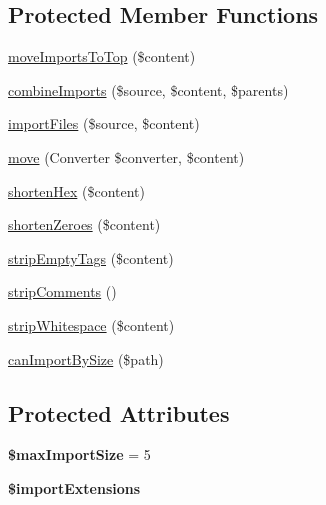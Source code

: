 \subsection*{Protected Member Functions}
\begin{DoxyCompactItemize}
\item 
\hyperlink{classMatthiasMullie_1_1Minify_1_1CSS_a5386ca48afa960a0d38e6a6c6cc33524}{move\+Imports\+To\+Top} (\$content)
\item 
\hyperlink{classMatthiasMullie_1_1Minify_1_1CSS_a35edd8cac08f2804285f0fed59cf433d}{combine\+Imports} (\$source, \$content, \$parents)
\item 
\hyperlink{classMatthiasMullie_1_1Minify_1_1CSS_a086c79c42e98915aea8717f3ceecd8df}{import\+Files} (\$source, \$content)
\item 
\hyperlink{classMatthiasMullie_1_1Minify_1_1CSS_ac51ff618a433cb21cac1a5461f60e83d}{move} (Converter \$converter, \$content)
\item 
\hyperlink{classMatthiasMullie_1_1Minify_1_1CSS_a8cb5447bafb6729cf834342764ad2e71}{shorten\+Hex} (\$content)
\item 
\hyperlink{classMatthiasMullie_1_1Minify_1_1CSS_a78937078a88a71de25f9e5004bb89ce0}{shorten\+Zeroes} (\$content)
\item 
\hyperlink{classMatthiasMullie_1_1Minify_1_1CSS_a6b69c7a87572e206dd0e2da0910d4504}{strip\+Empty\+Tags} (\$content)
\item 
\hyperlink{classMatthiasMullie_1_1Minify_1_1CSS_ac819241f35b6e70212739f651fdd4d85}{strip\+Comments} ()
\item 
\hyperlink{classMatthiasMullie_1_1Minify_1_1CSS_a631d8a7ad99611b7c3c21fdb22108587}{strip\+Whitespace} (\$content)
\item 
\hyperlink{classMatthiasMullie_1_1Minify_1_1CSS_ae59315fd10d871ed39fdfa28ec47f7ed}{can\+Import\+By\+Size} (\$path)
\end{DoxyCompactItemize}
\subsection*{Protected Attributes}
\begin{DoxyCompactItemize}
\item 
{\bfseries \$max\+Import\+Size} = 5\hypertarget{classMatthiasMullie_1_1Minify_1_1CSS_a4a146ebaa02ef07d531a5e0760e924b9}{}\label{classMatthiasMullie_1_1Minify_1_1CSS_a4a146ebaa02ef07d531a5e0760e924b9}

\item 
{\bfseries \$import\+Extensions}
\end{DoxyCompactItemize}

